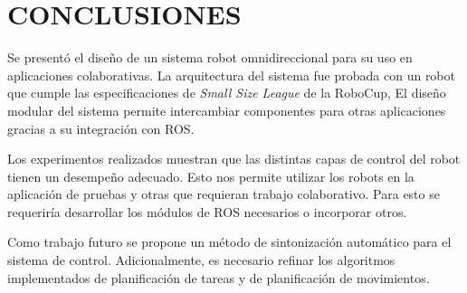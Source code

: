 \documentclass[twocolumn,10pt]{amrob}
\newcommand{\TODO}[1]{{\color{red}{ToDo: {#1}}}}
\begin{document}
\section*{CONCLUSIONES}
\label{sec:conclusiones}
Se presentó el diseño de un sistema robot omnidireccional para su uso en aplicaciones colaborativas. La arquitectura del sistema fue probada con un robot que cumple las especificaciones de \emph{Small Size League} de la RoboCup, El diseño modular del sistema permite intercambiar componentes para otras aplicaciones gracias a su integración con ROS.

Los experimentos realizados muestran que las distintas capas de control del robot tienen un desempeño adecuado. Esto nos permite utilizar los robots en la aplicación de pruebas y otras que requieran trabajo colaborativo. Para esto se requeriría desarrollar los módulos de ROS necesarios o incorporar otros.

Como trabajo futuro se propone un método de sintonización automático para el sistema de control. Adicionalmente, es necesario refinar los algoritmos implementados de planificación de tareas y de planificación de movimientos.





\end{document}
